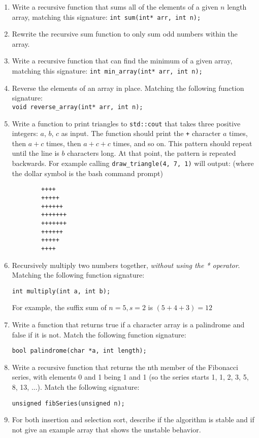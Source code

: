 \documentclass[11pt]{article}
\begin{document}
    \begin{enumerate}
        \item Write a recursive function that sums all of the elements of a given $n$ length array, matching this signature: \verb|int sum(int* arr, int n);|
        \item Rewrite the recursive sum function to only sum odd numbers within the array.
        \item Write a recursive function that can find the minimum of a given array, matching this signature:
        \verb|int min_array(int* arr, int n);|
        \item Reverse the elements of an array in place. Matching the following function signature:\\
        \verb|void reverse_array(int* arr, int n);|
    \item Write a function to print triangles to \verb|std::cout| that takes three positive integers: $a$, $b$, $c$ as input. The function should print the \verb|+| character $a$ times, then $a+c$ times, then $a+c+c$ times, and so on. This pattern should repeat until the line is $b$ characters long. At that point, the pattern is repeated backwards. For example calling \verb|draw_triangle(4, 7, 1)| will output: (where the dollar symbol is the bash command prompt)
    \begin{verbatim}
        ++++
        +++++
        ++++++
        +++++++
        +++++++
        ++++++
        +++++
        ++++
    \end{verbatim} 

    \item Recursively multiply two numbers together, \emph{without using the * operator}. Matching the following function signature:

        \verb|int multiply(int a, int b);|

    For example, the suffix sum of $n=5, s=2$ is $(5+4+3) = 12$
    \item Write a function that returns true if a character array is a palindrome and false if it is not. Match the following function signature:
    
        \verb|bool palindrome(char *a, int length);|
        
    \item Write a recursive function that returns the nth member of the Fibonacci series, with elements 0 and 1 being 1 and 1 (so the series starts 1, 1, 2, 3, 5, 8, 13, ...). Match the following signature:
    
        \verb|unsigned fibSeries(unsigned n);|
    \item For both insertion and selection sort, describe if the algorithm is stable and if not give an example array that shows the unstable behavior.
    \end{enumerate}
    
    \label{r:lastpage}
    
    
\end{document}
